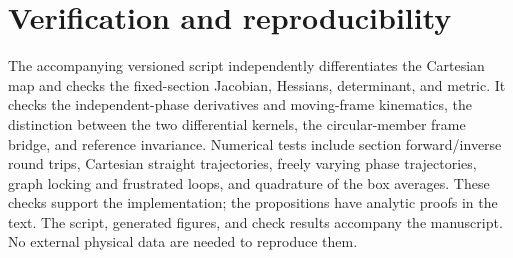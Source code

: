 \documentclass[11pt]{article}
\begin{document}
\section{Verification and reproducibility}

The accompanying versioned script independently differentiates the Cartesian map and checks the fixed-section Jacobian, Hessians, determinant, and metric. It checks the independent-phase derivatives and moving-frame kinematics, the distinction between the two differential kernels, the circular-member frame bridge, and reference invariance. Numerical tests include section forward/inverse round trips, Cartesian straight trajectories, freely varying phase trajectories, graph locking and frustrated loops, and quadrature of the box averages. These checks support the implementation; the propositions have analytic proofs in the text. The script, generated figures, and check results accompany the manuscript. No external physical data are needed to reproduce them.
\end{document}
